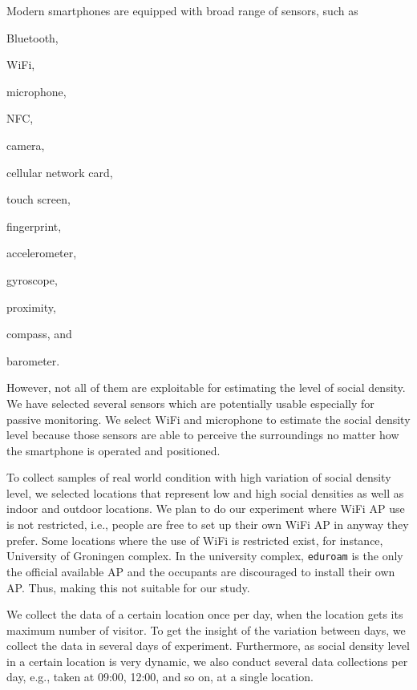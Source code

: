 Modern smartphones are equipped with broad range of sensors, such as
\begin{enumerate*}[label={\alph*)},font={\color{red!50!black}\bfseries}]
  \item Bluetooth,
  \item WiFi,
  \item microphone,
  \item NFC,
  \item camera,
  \item cellular network card,
  \item touch screen,
  \item fingerprint,
  \item accelerometer,
  \item gyroscope,
  \item proximity,
  \item compass, and
  \item barometer.
\end{enumerate*}
However, not all of them are exploitable for estimating the level of social density. We have selected several sensors which are potentially usable especially for passive monitoring. We select WiFi and microphone to estimate the social density level because those sensors are able to perceive the surroundings no matter how the smartphone is operated and positioned.

To collect samples of real world condition with high variation of social density level, we selected locations that represent low and high social densities as well as indoor and outdoor locations. We plan to do our experiment where WiFi \ac{AP} use is not restricted, i.e., people are free to set up their own WiFi \ac{AP} in anyway they prefer. Some locations where the use of WiFi is restricted exist, for instance, University of Groningen complex. In the university complex, \verb|eduroam| is the only the official available \ac{AP} and the occupants are discouraged to install their own \ac{AP}. Thus, making this not suitable for our study.

We collect the data of a certain location once per day, when the location gets its maximum number of visitor. To get the insight of the variation between days, we collect the data in several days of experiment. Furthermore, as social density level in a certain location is very dynamic, we also conduct several data collections per day, e.g., taken at 09:00, 12:00, and so on, at a single location.

